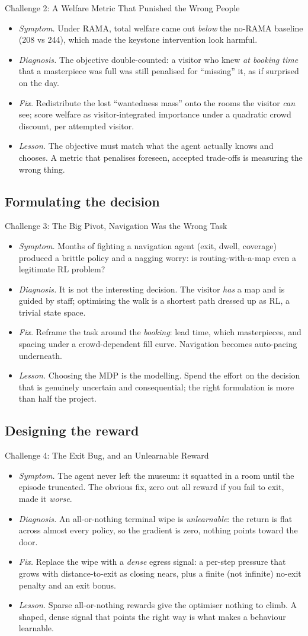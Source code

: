 \documentclass[aspectratio=169, 11pt]{beamer}
\newcommand{\good}[1]{\textcolor{safegreen}{#1}}
\newcommand{\bad}[1]{\textcolor{crowdred}{#1}}
\newcommand{\warn}[1]{\textcolor{warnorange}{#1}}
\newcommand{\emp}[1]{\textit{#1}}
\newcommand{\sdfl}[4]{%
\begin{itemize}\setlength\itemsep{2pt}
\item[\bad{\textbf{S}}] \emp{Symptom.} #1
\item[\warn{\textbf{D}}] \emp{Diagnosis.} #2
\item[\good{\textbf{F}}] \emp{Fix.} #3
\item[\textbf{L}] \emp{Lesson.} #4
\end{itemize}}
\begin{document}
\begin{frame}{Challenge 2: A Welfare Metric That Punished the Wrong People}
\footnotesize
\sdfl
{Under RAMA, total welfare came out \emp{below} the no-RAMA baseline (208 vs 244), which
made the keystone intervention look harmful.}
{The objective double-counted: a visitor who knew \emp{at booking time} that a
masterpiece was full was still penalised for ``missing'' it, as if surprised on the day.}
{Redistribute the lost ``wantedness mass'' onto the rooms the visitor \emp{can} see;
score welfare as visitor-integrated importance under a quadratic crowd discount, per
attempted visitor.}
{The objective must match what the agent actually knows and chooses. A metric that
penalises foreseen, accepted trade-offs is measuring the wrong thing.}
\end{frame}

\subsection*{Formulating the decision}

\begin{frame}{Challenge 3: The Big Pivot, Navigation Was the Wrong Task}
\footnotesize
\sdfl
{Months of fighting a navigation agent (exit, dwell, coverage) produced a brittle
policy and a nagging worry: is routing-with-a-map even a legitimate RL problem?}
{It is not the interesting decision. The visitor \emp{has} a map and is guided by staff;
optimising the walk is a shortest path dressed up as RL, a trivial state space.}
{Reframe the task around the \emp{booking}: lead time, which masterpieces, and spacing
under a crowd-dependent fill curve. Navigation becomes auto-pacing underneath.}
{Choosing the MDP is the modelling. Spend the effort on the decision that is genuinely
uncertain and consequential; the right formulation is more than half the project.}
\end{frame}

\subsection*{Designing the reward}

\begin{frame}{Challenge 4: The Exit Bug, and an Unlearnable Reward}
\footnotesize
\sdfl
{The agent never left the museum: it squatted in a room until the episode truncated.
The obvious fix, zero out all reward if you fail to exit, made it \emp{worse}.}
{An all-or-nothing terminal wipe is \emp{unlearnable}: the return is flat across almost
every policy, so the gradient is zero, nothing points toward the door.}
{Replace the wipe with a \emp{dense} egress signal: a per-step pressure that grows with
distance-to-exit as closing nears, plus a finite (not infinite) no-exit penalty and an
exit bonus.}
{Sparse all-or-nothing rewards give the optimiser nothing to climb. A shaped, dense
signal that points the right way is what makes a behaviour learnable.}
\end{frame}
\end{document}
